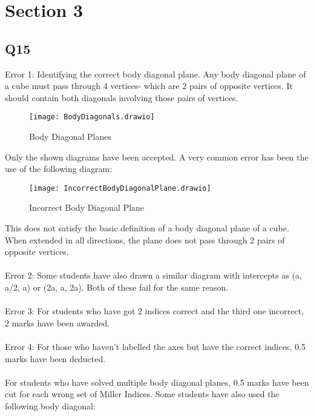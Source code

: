 \documentclass[12pt]{article}\date{}
\begin{document}
\section{Section 3}

\subsection{Q15}

Error 1: Identifying the correct body diagonal plane. Any body diagonal plane of a cube must pass through 4 vertices- which are 2 pairs of opposite vertices. It should contain both diagonals involving those pairs of vertices. 

\begin{figure}[!ht]
  \centering
  \texttt{[image: BodyDiagonals.drawio]}
\begin{tiny}
\caption{Body Diagonal Planes}
\end{tiny}
\end{figure}

\noindent Only the shown diagrams have been accepted. A very common error has been the use of the following diagram:

\begin{figure}[!ht]
  \centering
  \texttt{[image: IncorrectBodyDiagonalPlane.drawio]}
\begin{tiny}
\caption{Incorrect Body Diagonal Plane}
\end{tiny}
\end{figure}

\noindent This does not satisfy the basic definition of a body diagonal plane of a cube. When extended in all directions, the plane does not pass through 2 pairs of opposite vertices. \\
\\
Error 2: Some students have also drawn a similar diagram with intercepts as (a, a/2, a) or (2a, a, 2a). Both of these fail for the same reason. \\
\\
Error 3: For students who have got 2 indices correct and the third one incorrect, 2 marks have been awarded. \\
\\
Error 4: For those who haven't labelled the axes but have the correct indices, 0.5 marks have been deducted. \\ \\
For students who have solved multiple body diagonal planes, 0.5 marks have been cut for each wrong set of Miller Indices. Some students have also used the following body diagonal:
\end{document}
